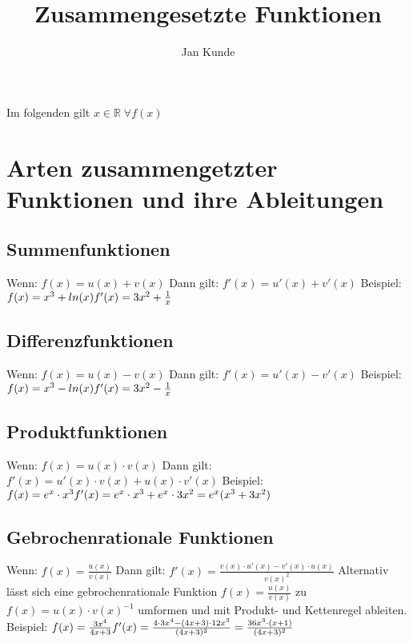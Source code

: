 \documentclass{article}
\title{Zusammengesetzte Funktionen}
\author{Jan Kunde}
\date{}
\begin{document}
\maketitle
\begin{center}
    Im folgenden gilt $ { x \in \mathbb{R} \; \forall f(x)} $
\end{center}
\raggedright
\section*{Arten zusammengetzter Funktionen und ihre Ableitungen}
    \subsection*{Summenfunktionen}
        Wenn: \break
        $f(x) = u(x) + v(x)$
        \break
        Dann gilt:\break
        $f'(x) = u'(x) + v'(x)$
        \break \break        
        Beispiel: \break \break
        $f(x) = x^3 + ln(x) \break f'(x) = 3x^2+\frac{1}{x}$

    \subsection*{Differenzfunktionen}
    Wenn: \break
    $f(x) = u(x) - v(x)$
    \break
    Dann gilt:\break
    $f'(x) = u'(x) - v'(x)$
    \break \break
    Beispiel: \break \break
    $f(x) = x^3 - ln(x) \break f'(x) = 3x^2 - \frac{1}{x}$

    \pagebreak
    
    \subsection*{Produktfunktionen}
    Wenn: \break
    $f(x) = u(x) \cdot v(x)$
    \break
    Dann gilt:\break
    $f'(x) = u'(x) \cdot v(x) + u(x) \cdot v'(x)$
    \break \break
    Beispiel: \break \break
    $f(x) = e^x \cdot x^3 \break
    f'(x) = e^x \cdot x^3 + e^x \cdot 3x^2 = e^x(x^3+3x^2)$
    


    \subsection*{Gebrochenrationale Funktionen}
    Wenn: \break
    $f(x) = \frac{u(x)}{v(x)}$
    \break
    Dann gilt: \break
    $f'(x) = \frac{v(x)\cdot u'(x) - v'(x) \cdot u(x)}{v(x)^2}$
    Alternativ lässt sich eine gebrochenrationale Funktion 
    $f(x) = \frac{u(x)}{v(x)}$ zu $f(x) = u(x) \cdot v(x)^{-1}$
    umformen und mit Produkt- und Kettenregel ableiten.
    \break \break
    Beispiel: \break \break
    $f(x) = \frac{3x^4}{4x+3}\break f'(x) = \frac{4\cdot 3x^4 - (4x+3) \cdot 12x^3}{(4x+3)^2} = \frac{36x^3\cdot (x+1)}{(4x+3)^2}$
\end{document}
